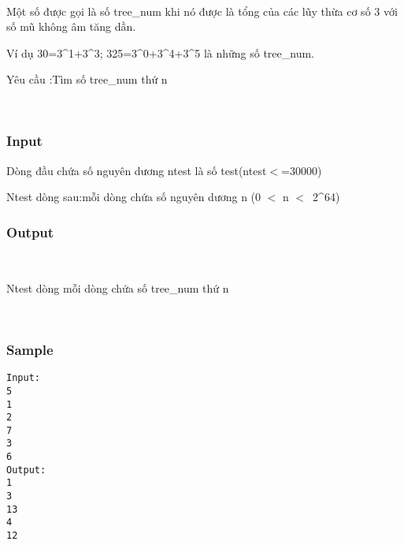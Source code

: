 

 

Một số được gọi là số tree\_num khi nó được là tổng của các lũy thừa cơ số 3 với số mũ không âm tăng dần.

Ví dụ 30=3\textasciicircum1+3\textasciicircum3; 325=3\textasciicircum0+3\textasciicircum4+3\textasciicircum5 là những số tree\_num.

Yêu cầu :Tìm số tree\_num thứ n

 

\subsubsection{Input}

Dòng đầu chứa số nguyên dương ntest là số test(ntest$<$=30000)

Ntest dòng sau:mỗi dòng chứa số nguyên dương n (0 $<$ n $<$ 2\textasciicircum64)

\subsubsection{Output}

 

Ntest dòng mỗi dòng chứa số tree\_num thứ n

 

\subsubsection{Sample}
\begin{verbatim}
Input:
5
1
2
7
3
6
Output:
1
3
13
4
12
\end{verbatim}